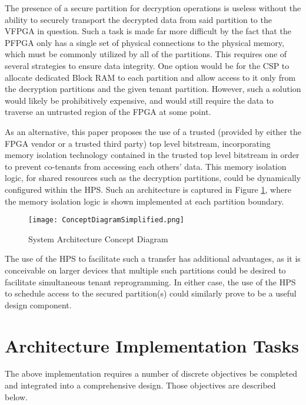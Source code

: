 The presence of a secure partition for decryption operations is useless without the ability to securely transport the decrypted data from said partition to the VFPGA in question. Such a task is made far more difficult by the fact that the PFPGA only has a single set of physical connections to the physical memory, which must be commonly utilized by all of the partitions. This requires one of several strategies to ensure data integrity. One option would be for the CSP to allocate dedicated Block RAM to each partition and allow access to it only from the decryption partitions and the given tenant partition. However, such a solution would likely be prohibitively expensive, and would still require the data to traverse an untrusted region of the FPGA at some point.

As an alternative, this paper proposes the use of a trusted (provided by either the FPGA vendor or a trusted third party) top level bitstream, incorporating memory isolation technology contained in the trusted top level bitstream in order to prevent co-tenants from accessing each others' data. This memory isolation logic, for shared resources such as the decryption partitions, could be dynamically configured within the HPS. Such an architecture is captured in Figure \ref{fig:topLevelDesign}, where the memory isolation logic is shown implemented at each partition boundary.

\begin{figure}
  \centering
  \texttt{[image: ConceptDiagramSimplified.png]}
  \caption{System Architecture Concept Diagram}
  \label{fig:topLevelDesign}
\end{figure}

The use of the HPS to facilitate such a transfer has additional advantages, as it is conceivable on larger devices that multiple such partitions could be desired to facilitate simultaneous tenant reprogramming. In either case, the use of the HPS to schedule access to the secured partition(s) could similarly prove to be a useful design component.

\section{Architecture Implementation Tasks}\label{subsec:Obj}
The above implementation requires a number of discrete objectives be completed and integrated into a comprehensive design. Those objectives are described below.

